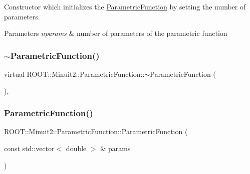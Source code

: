 Constructor which initializes the \mbox{\hyperlink{classROOT_1_1Minuit2_1_1ParametricFunction}{Parametric\+Function}} by setting the number of parameters.


\begin{DoxyParams}{Parameters}
{\em nparams} & number of parameters of the parametric function \\
\hline
\end{DoxyParams}
\mbox{\label{classROOT_1_1Minuit2_1_1ParametricFunction_a18aae731e634b4fc1c79403d8f49caa9}} 
\subsubsection{\texorpdfstring{$\sim$ParametricFunction()}{~ParametricFunction()}\hspace{0.1cm}{\footnotesize\ttfamily [1/3]}}
{\footnotesize\ttfamily virtual R\+O\+O\+T\+::\+Minuit2\+::\+Parametric\+Function\+::$\sim$\+Parametric\+Function (\begin{DoxyParamCaption}{ }\end{DoxyParamCaption})\hspace{0.3cm}{\ttfamily [inline]}, {\ttfamily [virtual]}}

\mbox{\label{classROOT_1_1Minuit2_1_1ParametricFunction_a5abce16504b1532a38da1409afdaa71d}} 
\subsubsection{\texorpdfstring{ParametricFunction()}{ParametricFunction()}\hspace{0.1cm}{\footnotesize\ttfamily [3/6]}}
{\footnotesize\ttfamily R\+O\+O\+T\+::\+Minuit2\+::\+Parametric\+Function\+::\+Parametric\+Function (\begin{DoxyParamCaption}\item[{const std\+::vector$<$ double $>$ \&}]{params }\end{DoxyParamCaption})\hspace{0.3cm}{\ttfamily [inline]}}


